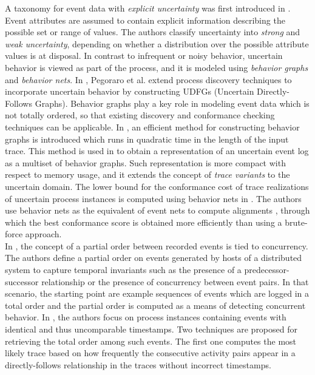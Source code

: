 A taxonomy for event data with \textit{explicit uncertainty} was first introduced in \cite{mining}.
Event attributes are assumed to contain explicit information describing the possible set or range of values.
The authors classify uncertainty into \textit{strong} and \textit{weak uncertainty}, depending on whether a distribution over the possible attribute values is at disposal.
In contrast to infrequent or noisy behavior, uncertain behavior is viewed as part of the process, and it is modeled using \textit{behavior graphs} and \textit{behavior nets}.
In \cite{discovery}, Pegoraro et al. extend process discovery techniques to incorporate uncertain behavior by constructing UDFGs (Uncertain Directly-Follows Graphs).
Behavior graphs play a key role in modeling event data which is not totally ordered, so that existing discovery and conformance checking techniques can be applicable.
In \cite{efficient}, an efficient method for constructing behavior graphs is introduced which runs in quadratic time in the length of the input trace.
This method is used in \cite{space} to obtain a representation of an uncertain event log as a multiset of behavior graphs.
Such representation is more compact with respect to memory usage, and it extends the concept of \textit{trace variants} to the uncertain domain.
The lower bound for the conformance cost of trace realizations of uncertain process instances is computed using behavior nets in \cite{conformance}. 
The authors use behavior nets as the equivalent of event nets to compute alignments \cite{alignment}, through which the best conformance score is obtained more efficiently than using a brute-force approach.\\
In \cite{distributed}, the concept of a partial order between recorded events is tied to concurrency.
The authors define a partial order on events generated by hosts of a distributed system to capture temporal invariants such as the presence of a predecessor-successor relationship or the presence of concurrency between event pairs.
In that scenario, the starting point are example sequences of events which are logged in a total order and the partial order is computed as a means of detecting concurrent behavior.
In \cite{repair}, the authors focus on process instances containing events with identical and thus uncomparable timestamps. 
Two techniques are proposed for retrieving the total order among such events.
The first one computes the most likely trace based on how frequently the consecutive activity pairs appear in a directly-follows relationship in the traces without incorrect timestamps.
